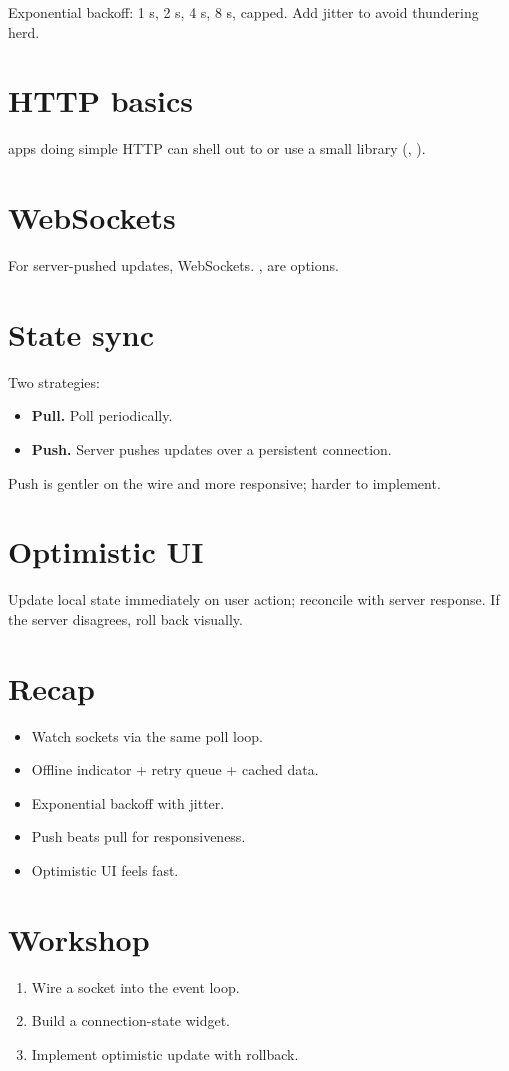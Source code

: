 Exponential backoff: 1 s, 2 s, 4 s, 8 s, capped. Add
jitter to avoid thundering herd.

\section{HTTP basics}

\maya{} apps doing simple HTTP can shell out to 
or use a small library (, ).

\section{WebSockets}

For server-pushed updates, WebSockets. ,
 are options.

\section{State sync}

Two strategies:

\begin{itemize}[leftmargin=*]
  \item \textbf{Pull.} Poll periodically.
  \item \textbf{Push.} Server pushes updates over a
    persistent connection.
\end{itemize}

Push is gentler on the wire and more responsive; harder to
implement.

\section{Optimistic UI}

Update local state immediately on user action; reconcile
with server response. If the server disagrees, roll back
visually.

\section{Recap}

\begin{recap}
\begin{itemize}[leftmargin=*]
  \item Watch sockets via the same poll loop.
  \item Offline indicator + retry queue + cached data.
  \item Exponential backoff with jitter.
  \item Push beats pull for responsiveness.
  \item Optimistic UI feels fast.
\end{itemize}
\end{recap}

\section*{Workshop}

\begin{enumerate}[leftmargin=*]
  \item Wire a socket into the event loop.
  \item Build a connection-state widget.
  \item Implement optimistic update with rollback.
\end{enumerate}
